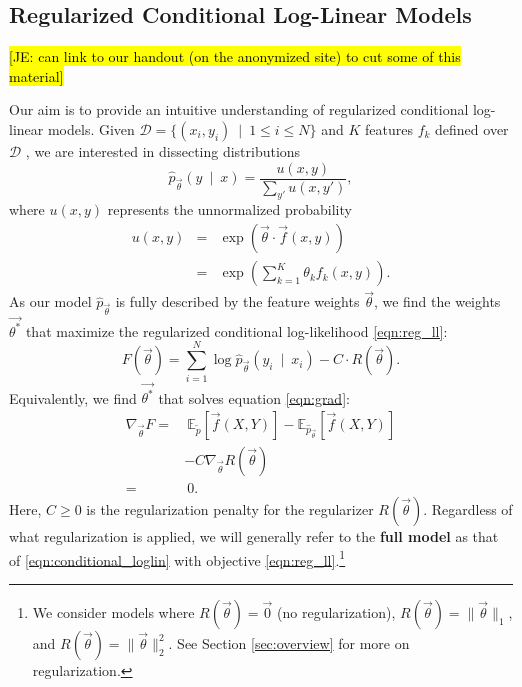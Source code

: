 \documentclass[11pt,letterpaper]{article}
\newcommand{\Note}[1]{}
\renewcommand{\Note}[1]{\hl{[#1]}}
\newcommand{\NoteSigned}[3]{{\sethlcolor{#2}\Note{#1: #3}}}
\newcommand{\NoteJE}[1]{\NoteSigned{JE}{LightGreen}{#1}}
\newcommand{\empirical}[0]{\ensuremath{\tilde{p}}}
\newcommand{\Data}[0]{\ensuremath{\mathcal{D}}}
\begin{document}
\subsection{Regularized Conditional Log-Linear Models} \label{sec:model} 

\NoteJE{can link to our handout (on the anonymized site) to cut some
  of this material}

Our aim is to provide an intuitive understanding of regularized conditional log-linear models. Given $\Data{} = \{( x_i, y_i)\ \mid\ 1 \le i \le N\}$ and $K$ features $f_k$ defined over \Data{} , we are interested in dissecting distributions 
\begin{equation}
\hat{p}_{\vec{\theta}}\left(y\ \mid\ x\right) = \frac{u(x, y)}{\sum_{y'} u(x,y')},
\label{eqn:conditional_loglin}
\end{equation}
where $u(x,y)$ represents the unnormalized probability
\begin{eqnarray}
u(x,y) & = & \exp{\left(\vec{\theta}\cdot \vec{f}(x,y)\right)}\\
& = & \exp{\left(\sum_{k=1}^K \theta_k f_k(x,y)\right)}.
\end{eqnarray}
As our model $\hat{p}_{\vec{\theta}}$ is fully described by the feature weights $\vec{\theta}$, we find the weights $\vec{\theta^*}$ that maximize the regularized conditional log-likelihood \eqref{eqn:reg_ll}:
\begin{equation}
F\left(\vec{\theta}\right) = \sum_{i=1}^N \log{\hat{p}_{\vec{\theta}}\left(y_i\ \mid\ x_i\right)} - C \cdot R\left(\vec{\theta}\right).
\label{eqn:reg_ll}
\end{equation}
Equivalently, we find $\vec{\theta^*}$ that solves equation \eqref{eqn:grad}:
\begin{equation}
\begin{aligned}
\nabla_{\vec{\theta}} F
 = &
\ \mathbb{E}_{\empirical{}}\left[\vec{f}(X,Y)\right] 
- \mathbb{E}_{{\hat{p}_{\vec{\theta}}}}\left[\vec{f}(X,Y)\right]\\
 & - C \nabla_{\vec{\theta}}R(\vec{\theta})
\label{eqn:grad} \\
 = &\ 0.
\end{aligned}
\end{equation}
Here, $C \ge 0$ is the regularization penalty for the regularizer $R(\vec{\theta})$. Regardless of what regularization is applied, we will generally refer to the \textbf{full model} as that of \eqref{eqn:conditional_loglin} with objective \eqref{eqn:reg_ll}.\footnote{We consider models where $R(\vec{\theta}) = \vec{0}$ (no regularization), $R(\vec{\theta}) = \|\vec\theta\|_1$, and $R(\vec{\theta}) = \|\vec{\theta}\|_2^2$. See Section \ref{sec:overview} for more on regularization.}
\end{document}

